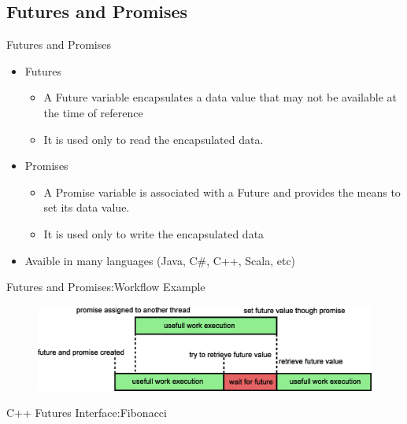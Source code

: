 \documentclass[svgnames]{beamer}
\begin{document}
\subsection{Futures and Promises}
\begin{frame}{Futures and Promises}
\begin{itemize}
	\item Futures
	\begin{itemize}
		\item A Future variable encapsulates a data value that may not be available at the time of reference
		\item It is used only to read the encapsulated data.
	\end{itemize}
	\item Promises
	\begin{itemize}
		\item A Promise variable is associated with a Future and provides the means to set its data value.
		\item It is used only to write the encapsulated data 
	\end{itemize}
\vfill
	\item Avaible in many languages (Java, C\#, C++, Scala, etc)
\end{itemize}
\end{frame}
\begin{frame}{Futures and Promises:Workflow Example}
\begin{figure}
\includegraphics[width=\columnwidth]{images/futures_blocking}
\end{figure}
\end{frame}
\begin{frame}[fragile]{C++ Futures Interface:Fibonacci}
\lstFuturesBlocking
\end{frame}
\end{document}
